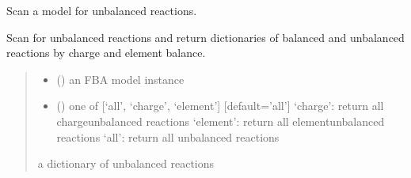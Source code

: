\documentclass[letterpaper,12pt,english]{sphinxmanual}
\begin{document}
\begin{fulllineitems}
\label{\detokenize{api/core:cbmpy.CBTools.scanForUnbalancedReactions}}
\pysigstartsignatures
\pysiglinewithargsret
{}
{\sphinxparamcomma {}}
{}
\pysigstopsignatures
\sphinxAtStartPar
Scan a model for unbalanced reactions.

\sphinxAtStartPar
Scan for unbalanced reactions and return dictionaries of balanced and
unbalanced reactions by charge and element balance.
\begin{quote}\begin{description}
\begin{itemize}
\item {} 
\sphinxAtStartPar
{} () \textendash{} an FBA model instance

\item {} 
\sphinxAtStartPar
{} (\sphinxstyleliteralemphasis{\sphinxupquote{, }}) \textendash{} one of {[}‘all’, ‘charge’, ‘element’{]} {[}default=’all’{]}
\sphinxhyphen{} ‘charge’: return all charge\sphinxhyphen{}unbalanced reactions
\sphinxhyphen{} ‘element’: return all element\sphinxhyphen{}unbalanced reactions
\sphinxhyphen{} ‘all’: return all unbalanced reactions

\end{itemize}

\sphinxAtStartPar
{} \textendash{} a dictionary of unbalanced reactions

\end{description}\end{quote}

\end{fulllineitems}

\end{document}
